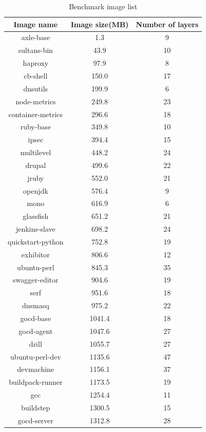 \documentclass{ieicej}
\begin{document}
\begin{table}[ht]
	\begin{tabular}{| c | c | c |}
\hline
Image name & Image size(MB) & Number of layers \\
\hline
axle-base & 1.3 & 9 \\
\hline
sultans-bin & 43.9 & 10 \\
\hline
haproxy & 97.9 & 8 \\
\hline
cb-shell & 150.0 & 17 \\
\hline
dnsutils & 199.9 & 6 \\
\hline
node-metrics & 249.8 & 23 \\
\hline
container-metrics & 296.6 & 18 \\
\hline
ruby-base & 349.8 & 10 \\
\hline
ipsec & 394.4 & 15 \\
\hline
multilevel & 448.2 & 24 \\
\hline
drupal & 499.6 & 22 \\
\hline
jruby & 552.0 & 21 \\
\hline
openjdk & 576.4 & 9 \\
\hline
mono & 616.9 & 6 \\
\hline
glassfish & 651.2 & 21 \\
\hline
jenkins-slave & 698.2 & 24 \\
\hline
quickstart-python & 752.8 & 19 \\
\hline
exhibitor & 806.6 & 12 \\
\hline
ubuntu-perl & 845.3 & 35 \\
\hline
swagger-editor & 904.6 & 19 \\
\hline
serf & 951.6 & 18 \\
\hline
dnsmasq & 975.2 & 22 \\
\hline
gocd-base & 1041.4 & 18 \\
\hline
gocd-agent & 1047.6 & 27 \\
\hline
drill & 1055.7 & 27 \\
\hline
ubuntu-perl-dev & 1135.6 & 47 \\
\hline
devmachine & 1156.1 & 37 \\
\hline
buildpack-runner & 1173.5 & 19 \\
\hline
gcc & 1254.4 & 11 \\
\hline
buildstep & 1300.5 & 15 \\
\hline
gocd-server & 1312.8 & 28 \\
\hline
	\end{tabular}
	\caption{Benchmark image list}
  \label{bench_img_l}
\end{table}
\end{document}
